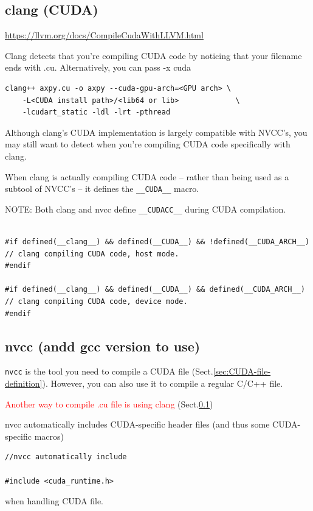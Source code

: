 \subsection{clang (CUDA)}
\label{sec:clang-cuda}

\url{https://llvm.org/docs/CompileCudaWithLLVM.html}


Clang detects that you’re compiling CUDA code by noticing that your filename
ends with .cu. Alternatively, you can pass -x cuda

\begin{verbatim}
clang++ axpy.cu -o axpy --cuda-gpu-arch=<GPU arch> \
    -L<CUDA install path>/<lib64 or lib>             \
    -lcudart_static -ldl -lrt -pthread
\end{verbatim}

Although clang’s CUDA implementation is largely compatible with NVCC’s, you may
still want to detect when you’re compiling CUDA code specifically with clang.

When clang is actually compiling CUDA code – rather than being used as a subtool
of NVCC’s – it defines the \verb!__CUDA__! macro.

NOTE: Both clang and nvcc define \verb!__CUDACC__! during CUDA compilation.

\begin{lstlisting}

#if defined(__clang__) && defined(__CUDA__) && !defined(__CUDA_ARCH__)
// clang compiling CUDA code, host mode.
#endif

#if defined(__clang__) && defined(__CUDA__) && defined(__CUDA_ARCH__)
// clang compiling CUDA code, device mode.
#endif

\end{lstlisting}

\subsection{nvcc (andd gcc version to use)}
\label{sec:nvcc}

\verb!nvcc! is the tool you need to compile a CUDA file (Sect.\ref{sec:CUDA-file-definition}).
However, you can also use it to compile a regular C/C++ file.

\textcolor{red}{Another way to compile .cu file is using clang} (Sect.\ref{sec:clang-cuda})

nvcc automatically includes CUDA-specific header files (and thus some CUDA-specific macros)
\begin{verbatim}
//nvcc automatically include

#include <cuda_runtime.h>
\end{verbatim}
when handling CUDA file.

